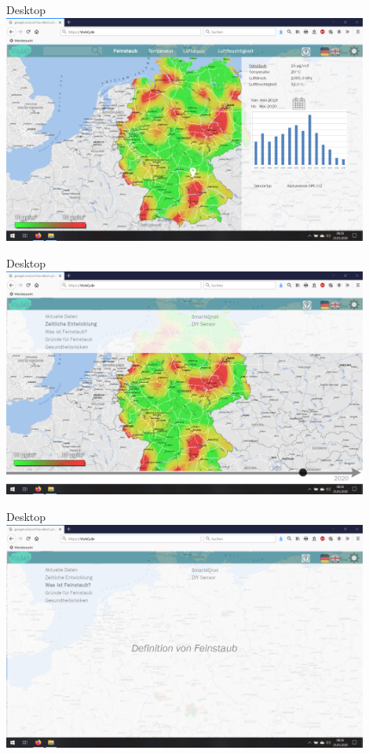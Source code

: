 \begin{frame}{Desktop}
    \includegraphics[width=0.9\textwidth]{../../media/Aktuelle-Daten}
\end{frame}
\begin{frame}{Desktop}
    \includegraphics[width=0.9\textwidth]{../../media/Zeitliche-Entwicklung}
\end{frame}
\begin{frame}{Desktop}
    \includegraphics[width=0.9\textwidth]{../../media/Definition-von-Feinstaub}
\end{frame}
